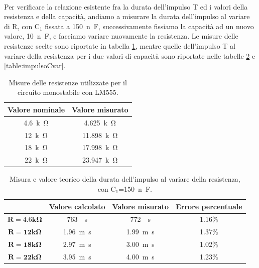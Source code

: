 \documentclass{report}
\begin{document}
\\Per verificare la relazione esistente fra la durata dell'impulso T ed i valori della resistenza e della capacità, andiamo a misurare la durata dell'impulso al variare di R, con $\mathrm{C_1}$ fissata a \SI{150}{n\farad}, successivamente fissiamo la capacità ad un nuovo valore, \SI{10}{n\farad}, e facciamo variare nuovamente la resistenza. Le misure delle resistenze scelte sono riportate in tabella \ref{table:mis_res2}, mentre quelle dell'impulso T al variare della resistenza per i due valori di capacità sono riportate nelle tabelle \ref{table:impulsoRvar} e \ref{table:impulsoCvar}.
\begin{table}[h!]
	\centering
	\begin{tabular}{|c|c|}
	\hline
		\textbf{Valore nominale} & \textbf{Valore misurato}\\ 
		\hline
		\SI{4.6}{k\ohm} & \SI{4.625}{k\ohm} \\ 
		\hline
		 \SI{12}{k\ohm} & \SI{11.898}{k\ohm} \\ 
		\hline
		\SI{18}{k\ohm} & \SI{17.998}{k\ohm} \\ 
		\hline
		 \SI{22}{k\ohm} & \SI{23.947}{k\ohm} \\ 
		\hline
	\end{tabular}
	\caption{Misure delle resistenze utilizzate per il circuito monostabile con LM555.}
	\label{table:mis_res2}
\end{table}
\begin{table}[h!]
	\centering
	\begin{tabular}{|c|c|c|c|}
		\cline{2-4} 
		\multicolumn{1}{c|}{} & \textbf{Valore calcolato} & \textbf{Valore misurato}& \textbf{Errore percentuale}\\ 
		\hline
		$\mathbf{{R = 4.6k}\Omega}$ & \SI{763}{\mu\second} & \SI{772}{\mu\second} & 1.16\% \\ 
		\hline
		$\mathbf{{R = 12k}\Omega}$ & \SI{1.96}{m\second} & \SI{1.99}{m\second} & 1.37\% \\ 
		\hline
		$\mathbf{{R = 18k}\Omega}$ & \SI{2.97}{m\second} & \SI{3.00}{m\second} & 1.02\% \\ 
		\hline
		$\mathbf{{R = 22k}\Omega}$ & \SI{3.95}{m\second} & \SI{4.00}{m\second} & 1.23\% \\ 
		\hline
	\end{tabular}
	\caption{Misura e valore teorico della durata dell'impulso al variare della resistenza, con $\mathrm{C_1}$=\SI{150}{n\farad}.}
	\label{table:impulsoRvar}
\end{table}
\end{document}
